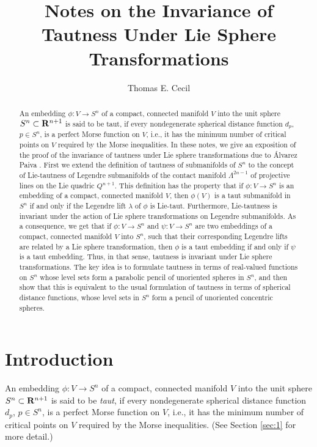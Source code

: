 \documentclass[12pt]{article}
\begin{document}
\title
{\bf Notes on the Invariance of Tautness Under Lie Sphere Transformations}
\author
{Thomas E. Cecil}
\maketitle

\begin{abstract}
An embedding $\phi:V \rightarrow S^n$ 
of a compact, connected manifold $V$ into the unit sphere $S^n \subset {\bf R}^{n+1}$ 
is said to be taut, if every nondegenerate spherical distance function $d_p$, $p \in S^n$, is a perfect
Morse function on $V$, i.e., it 
has the minimum
number of critical points  on $V$ required by the Morse inequalities.
In these notes, we give an exposition of the
proof of the invariance of tautness under Lie sphere transformations due to \'{A}lvarez Paiva \cite{Alv}. First we extend
the definition of tautness of submanifolds of $S^n$ to 
the concept of Lie-tautness of Legendre submanifolds of the contact manifold 
$\Lambda^{2n-1}$ of projective lines on the Lie quadric $Q^{n+1}$.
This definition has the property that if $\phi:V \rightarrow S^n$ is an embedding of a compact, connected manifold $V$, then
$\phi(V)$ is a taut submanifold in $S^n$ if and only if the Legendre lift $\lambda$
of $\phi$ is Lie-taut. Furthermore, Lie-tautness is invariant under the action of Lie sphere transformations on Legendre submanifolds.  
As a consequence, we get that
if $\phi:V \rightarrow S^n$ and $\psi:V \rightarrow S^n$ are two embeddings of a compact, connected  
manifold $V$ into $S^n$, 
such that their corresponding Legendre lifts are related by a Lie sphere transformation,
then $\phi$ is a taut embedding if and only if $\psi$ is a taut embedding.  Thus, in that sense, tautness is invariant under Lie sphere transformations.
The key idea is to formulate tautness in terms of real-valued
functions on $S^n$ whose level sets form a parabolic pencil 
of unoriented spheres in $S^n$, and then show that this is equivalent to the usual formulation 
of tautness in terms of spherical distance functions,
whose level sets in $S^n$ form a pencil of unoriented concentric spheres.  
\end{abstract}


\section{Introduction}
\label{intro}
An embedding $\phi:V \rightarrow S^n$ 
of a compact, connected manifold $V$ into the unit sphere $S^n \subset {\bf R}^{n+1}$ 
is said to be {\em taut}, if every nondegenerate spherical distance function $d_p$, $p \in S^n$, is a perfect
Morse function on $V$, i.e., it has the minimum
number of critical points  on $V$ required by the Morse inequalities. (See Section \ref{sec:1} for more detail.)
\end{document}
